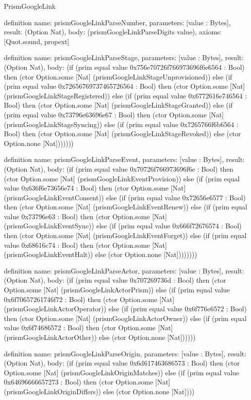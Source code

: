 \begin{lexlean}{PrismGoogleLink}
\begin{semanticmodule}
definition{
  name: prismGoogleLinkParseNumber,
  parameters: [value : Bytes],
  result: (Option Nat),
  body: (prismGoogleLinkParseDigits value),
  axioms: [Quot.sound, propext]
}

definition{
  name: prismGoogleLinkParseStage,
  parameters: [value : Bytes],
  result: (Option Nat),
  body: (if (prim equal value 0x756e70726f766973696f6e6564 : Bool) then (ctor Option.some [Nat] (prismGoogleLinkStageUnprovisioned)) else (if (prim equal value 0x72656769737465726564 : Bool) then (ctor Option.some [Nat] (prismGoogleLinkStageRegistered)) else (if (prim equal value 0x6772616e746564 : Bool) then (ctor Option.some [Nat] (prismGoogleLinkStageGranted)) else (if (prim equal value 0x73796e63696e67 : Bool) then (ctor Option.some [Nat] (prismGoogleLinkStageSyncing)) else (if (prim equal value 0x7265766f6b6564 : Bool) then (ctor Option.some [Nat] (prismGoogleLinkStageRevoked)) else (ctor Option.none [Nat]))))))
}

definition{
  name: prismGoogleLinkParseEvent,
  parameters: [value : Bytes],
  result: (Option Nat),
  body: (if (prim equal value 0x70726f766973696f6e : Bool) then (ctor Option.some [Nat] (prismGoogleLinkEventProvision)) else (if (prim equal value 0x636f6e73656e74 : Bool) then (ctor Option.some [Nat] (prismGoogleLinkEventConsent)) else (if (prim equal value 0x72656e6577 : Bool) then (ctor Option.some [Nat] (prismGoogleLinkEventRenew)) else (if (prim equal value 0x73796e63 : Bool) then (ctor Option.some [Nat] (prismGoogleLinkEventSync)) else (if (prim equal value 0x666f72676574 : Bool) then (ctor Option.some [Nat] (prismGoogleLinkEventForget)) else (if (prim equal value 0x68616c74 : Bool) then (ctor Option.some [Nat] (prismGoogleLinkEventHalt)) else (ctor Option.none [Nat])))))))
}

definition{
  name: prismGoogleLinkParseActor,
  parameters: [value : Bytes],
  result: (Option Nat),
  body: (if (prim equal value 0x707269736d : Bool) then (ctor Option.some [Nat] (prismGoogleLinkActorPrism)) else (if (prim equal value 0x6f70657261746f72 : Bool) then (ctor Option.some [Nat] (prismGoogleLinkActorOperator)) else (if (prim equal value 0x6f776e6572 : Bool) then (ctor Option.some [Nat] (prismGoogleLinkActorOwner)) else (if (prim equal value 0x6f74686572 : Bool) then (ctor Option.some [Nat] (prismGoogleLinkActorOther)) else (ctor Option.none [Nat])))))
}

definition{
  name: prismGoogleLinkParseOrigin,
  parameters: [value : Bytes],
  result: (Option Nat),
  body: (if (prim equal value 0x6d617463686573 : Bool) then (ctor Option.some [Nat] (prismGoogleLinkOriginMatches)) else (if (prim equal value 0x64696666657273 : Bool) then (ctor Option.some [Nat] (prismGoogleLinkOriginDiffers)) else (ctor Option.none [Nat])))
}


\end{semanticmodule}
\end{lexlean}
